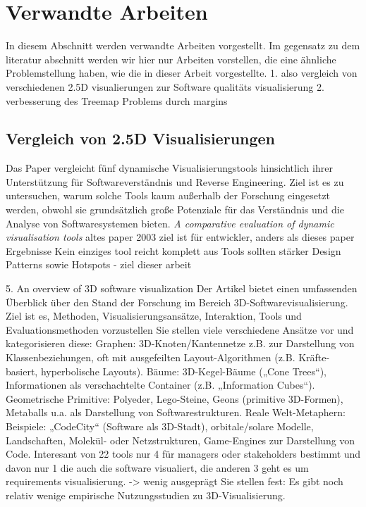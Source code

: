 \chapter{Verwandte Arbeiten} \label{sec:VerwandteArbeiten}
In diesem Abschnitt werden verwandte Arbeiten vorgestellt.
Im gegensatz zu dem literatur abschnitt werden wir hier nur Arbeiten vorstellen, die eine ähnliche Problemstellung haben, wie die in dieser Arbeit vorgestellte.
1. also vergleich von verschiedenen 2.5D visualierungen zur Software qualitäts visualisierung
2. verbesserung des Treemap Problems durch margins



\section{Vergleich von 2.5D Visualisierungen}



Das Paper vergleicht fünf dynamische Visualisierungstools hinsichtlich ihrer Unterstützung für Softwareverständnis und Reverse Engineering. Ziel ist es zu untersuchen, warum solche Tools kaum außerhalb der Forschung eingesetzt werden, obwohl sie grundsätzlich große Potenziale für das Verständnis und die Analyse von Softwaresystemen bieten. \textit{A comparative evaluation of dynamic visualisation tools} \cite{pacione2003comparative} 
altes paper 2003 
ziel ist für entwickler, anders als dieses paper
Ergebnisse Kein einziges tool reicht komplett aus
Tools sollten stärker Design Patterns sowie Hotspots - ziel dieser arbeit


5. An overview of 3D software visualization \cite{overview3D}
Der Artikel bietet einen umfassenden Überblick über den Stand der Forschung im Bereich 3D-Softwarevisualisierung. Ziel ist es, Methoden, Visualisierungsansätze, Interaktion, Tools und Evaluationsmethoden vorzustellen
Sie stellen viele verschiedene Ansätze vor und kategorisieren diese: Graphen: 3D-Knoten/Kantennetze z.B. zur Darstellung von Klassenbeziehungen, oft mit ausgefeilten Layout-Algorithmen (z.B. Kräfte-basiert, hyperbolische Layouts).
Bäume: 3D-Kegel-Bäume („Cone Trees“), Informationen als verschachtelte Container (z.B. „Information Cubes“).
Geometrische Primitive: Polyeder, Lego-Steine, Geons (primitive 3D-Formen), Metaballs u.a. als Darstellung von Softwarestrukturen.
Reale Welt-Metaphern:
Beispiele: „CodeCity“ (Software als 3D-Stadt), orbitale/solare Modelle, Landschaften, Molekül- oder Netzstrukturen, Game-Engines zur Darstellung von Code.
Interesant von 22 tools nur 4 für managers oder stakeholders bestimmt und davon nur 1 die auch die software visualiert, die anderen 3 geht es um requirements visualisierung. -> wenig ausgeprägt 
Sie stellen fest: Es gibt noch relativ wenige empirische Nutzungsstudien zu 3D-Visualisierung.




